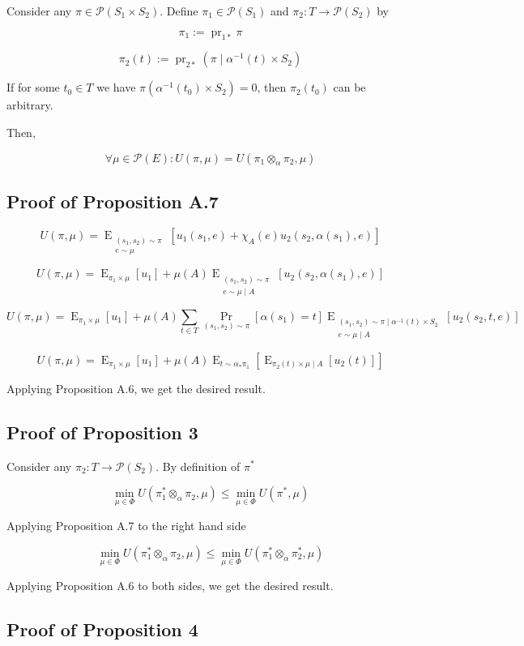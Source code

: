 \documentclass[a4paper]{article}
\DeclareMathOperator{\Prb}{Pr}
\DeclareMathOperator{\E}{E}
\newcommand{\EE}[2]{\operatorname{E}_{\substack{#1 \\ #2}}}
\DeclareMathOperator{\Prj}{pr}
\newcommand{\Prob}{\mathcal{P}}
\begin{document}
Consider any ${\pi \in \Prob(S_1 \times S_2)}$. Define ${\pi_1 \in \Prob(S_1)}$ and ${\pi_2: T \rightarrow \Prob(S_2)}$ by

$$\pi_1 := \Prj_{1*}\pi$$

$$\pi_2(t) := \Prj_{2*} (\pi \mid \alpha^{-1}(t) \times S_2)$$

If for some ${t_0 \in T}$ we have ${\pi(\alpha^{-1}(t_0) \times S_2)=0}$, then ${\pi_2(t_0)}$ can be arbitrary.

Then,

$$\forall \mu \in \Prob(E):U(\pi,\mu)=U(\pi_1 \otimes_\alpha \pi_2, \mu)$$

\subsection{Proof of Proposition A.7}

$$U(\pi, \mu) = \EE{(s_1,s_2) \sim \pi}{e \sim \mu}[u_1(s_1,e) + \chi_A(e) u_2(s_2, \alpha(s_1), e)]$$

$$U(\pi, \mu) = \E_{\pi_1 \times \mu}[u_1] + \mu(A) \EE{(s_1,s_2) \sim \pi}{e \sim \mu \mid A}[u_2(s_2, \alpha(s_1), e)]$$

$$U(\pi, \mu) = \E_{\pi_1 \times \mu}[u_1] + \mu(A) \sum_{t \in T} \Prb_{(s_1, s_2) \sim \pi}[\alpha(s_1)=t] \EE{(s_1,s_2) \sim \pi \mid \alpha^{-1}(t) \times S_2}{e \sim \mu \mid A}[u_2(s_2, t, e)]$$

$$U(\pi, \mu) = \E_{\pi_1 \times \mu}[u_1] + \mu(A) \E_{t \sim \alpha_*\pi_1}[\E_{\pi_2(t) \times \mu \mid A}[u_2(t)]]$$

Applying Proposition A.6, we get the desired result.

\subsection{Proof of Proposition 3}

Consider any ${\pi_2: T \rightarrow \Prob(S_2)}$. By definition of ${\pi^*}$ 

$${\min_{\mu \in \Phi} U(\pi_1^* \otimes_\alpha \pi_2, \mu) \leq \min_{\mu \in \Phi} U(\pi^*, \mu)}$$

Applying Proposition A.7 to the right hand side

$${\min_{\mu \in \Phi} U(\pi_1^* \otimes_\alpha \pi_2, \mu) \leq \min_{\mu \in \Phi} U(\pi_1^* \otimes_\alpha \pi_2^*, \mu)}$$

Applying Proposition A.6 to both sides, we get the desired result.

\subsection{Proof of Proposition 4}
\end{document}
